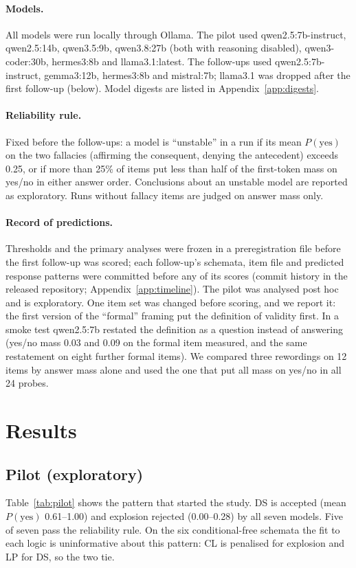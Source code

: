 \documentclass[11pt]{article}
\begin{document}
\paragraph{Models.}
All models were run locally through Ollama. The pilot used qwen2.5:7b-instruct, qwen2.5:14b,
qwen3.5:9b, qwen3.8:27b (both with reasoning disabled), qwen3-coder:30b, hermes3:8b and llama3.1:latest. The follow-ups used
qwen2.5:7b-instruct, gemma3:12b, hermes3:8b and mistral:7b; llama3.1 was dropped after the first
follow-up (below). Model digests are listed in Appendix~\ref{app:digests}.

\paragraph{Reliability rule.}
Fixed before the follow-ups: a model is ``unstable'' in a run if its mean $P(\text{yes})$ on the two
fallacies (affirming the consequent, denying the antecedent) exceeds 0.25, or if more than 25\% of items
put less than half of the first-token mass on yes/no in either answer order. Conclusions about an
unstable model are reported as exploratory. Runs without fallacy items are judged on answer mass only.

\paragraph{Record of predictions.}
Thresholds and the primary analyses were frozen in a preregistration file before the first follow-up was
scored; each follow-up's schemata, item file and predicted response patterns were committed before any
of its scores (commit history in the released repository; Appendix~\ref{app:timeline}). The pilot was
analysed post hoc and is exploratory. One item set was changed before scoring, and we report it: the
first version of the ``formal'' framing put the definition of validity first. In a smoke test
qwen2.5:7b restated the definition as a question instead of answering (yes/no mass 0.03 and 0.09 on the
formal item measured, and the same restatement on eight further formal items). We compared three
rewordings on 12 items by answer mass alone and used the one that put all mass on yes/no in all 24
probes.



\section{Results}

\subsection{Pilot (exploratory)}
Table~\ref{tab:pilot} shows the pattern that started the study. DS is accepted (mean
$P(\text{yes})$ 0.61--1.00) and explosion rejected (0.00--0.28) by all seven models. Five of seven pass
the reliability rule. On the six conditional-free schemata the fit to each logic is uninformative about
this pattern: CL is penalised for explosion and LP for DS, so the two tie.
\end{document}
